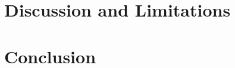 \documentclass[letterpaper]{aaai25}  %
\begin{document}


\section{Discussion and Limitations}
\label{sec:discussion}



\section{Conclusion}
\label{sec:conclusion}




\end{document}
